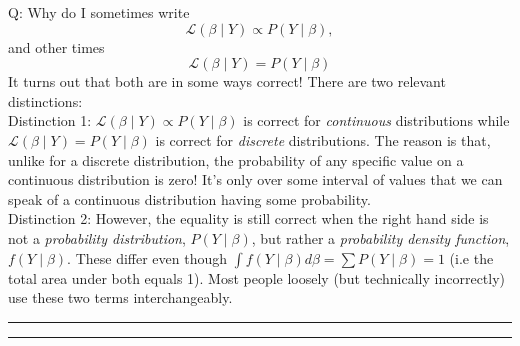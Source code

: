 \documentclass{article}
\begin{document}
Q: Why do I sometimes write
\begin{equation*}
	\mathcal{L}(\beta \mid Y) \propto P(Y  \mid \beta),
\end{equation*}
and other times
\begin{equation*}
	\mathcal{L}(\beta \mid Y)= P(Y  \mid \beta)
\end{equation*}
It turns out that both are in some ways correct!  There are two relevant distinctions:\\

Distinction 1: $\mathcal{L}(\beta \mid Y) \propto P(Y  \mid \beta)$ is correct for \emph{continuous} distributions while $\mathcal{L}(\beta \mid Y)= P(Y  \mid \beta)$ is correct for \emph{discrete} distributions.  The reason is that, unlike for a discrete distribution, the probability of any specific value on a continuous distribution is zero!  It's only over some interval of values that we can speak of a continuous distribution having some probability.\\

Distinction 2: However, the equality is still correct when the right hand side is not a \emph{probability distribution}, $P(Y \mid \beta)$, but rather a \emph{probability density function}, $f(Y \mid \beta)$.  These differ even though $\int f(Y \mid \beta) d\beta= \sum P(Y \mid \beta) = 1$ (i.e the total area under both equals 1).  Most people loosely (but technically incorrectly) use these two terms interchangeably. 

\rule[0.5ex]{\linewidth}{1pt}
\rule[0.5ex]{\linewidth}{1pt}
\end{document}
